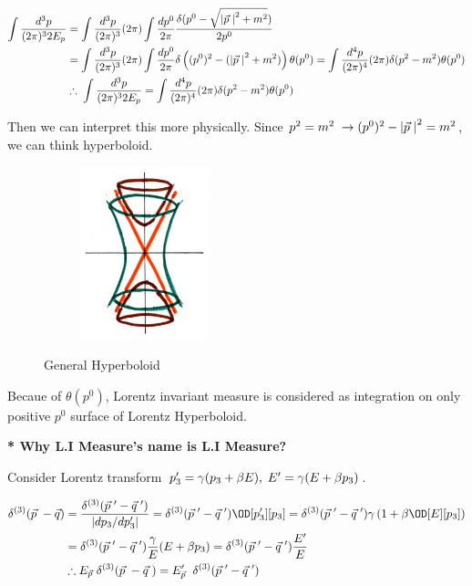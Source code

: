 \documentclass[11pt,letterpaper]{article}
\begin{document}
\begin{equation}
\begin{split}
 \int \frac{d^3p}{(2\pi)^32E_p} &= \int \frac{d^3p}{(2\pi)^3}(2\pi)\int \frac{dp^0}{2\pi}\frac{\delta(p^0 - \sqrt{\left|\vec{p}\hspace{0.1cm}\right|^2+m^2})}{2p^0} \\
                                &= \int \frac{d^3p}{(2\pi)^3}(2\pi)\int \frac{dp^0}{2\pi}\delta\left( (p^0)^2 - (\left|\vec{p}\hspace{0.1cm}\right|^2+m^2) \right)\theta(p^0) = \int \frac{d^4p}{(2\pi)^4}(2\pi)\delta(p^2 - m^2)\theta(p^0) \\
 & \therefore \hspace{0.1cm} \int \frac{d^3p}{(2\pi)^32E_p} = \int \frac{d^4p}{(2\pi)^4}(2\pi)\delta(p^2 - m^2)\theta(p^0) 
\end{split}
\end{equation}

Then we can interpret this more physically. Since $p^2 = m^2 \hspace{0.1cm} \rightarrow (p^0)^2 - \left|\vec{p}\hspace{0.1cm}\right|^2 = m^2$, we can think hyperboloid.

\begin{figure}[h!]
	\centering
	\begin{subfigure}{.4\textwidth}
		\centering
		\includegraphics[width=\textwidth, height=5cm]{Pictures/LM.jpg}
	\end{subfigure}
	\caption{General Hyperboloid}
\end{figure}

Becaue of $\theta(p^0)$, Lorentz invariant measure is considered as integration on only positive $p^0$ surface of Lorentz Hyperboloid.

\VS

\textbf{* Why L.I Measure's name is L.I Measure?}

Consider Lorentz transform $p_3' = \gamma (p_3 + \beta E),\hspace{0.1cm} E' = \gamma(E+\beta p_3)$.

\begin{equation}
\begin{split}
 \delta^{(3)}(\vp - \vec{q}) &= \frac{\DT(\vp' - \vq')}{\abs{dp_3/dp_3'}} = \DT(\vp' - \vq')\OD[p_3'][p_3] = \DT(\vp'-\vq')\gamma\BKS{1+\beta\OD[E][p_3]}\\
 &= \DT(\vp'-\vq')\frac{\gamma}{E}(E+\beta p_3) = \DT(\vp'-\vq')\frac{E'}{E} \\
 &\therefore \Ep\DT(\vp - \vq) = E_{\vp}'\hs\DT(\vp'-\vq')
\end{split}
\end{equation}
\end{document}
